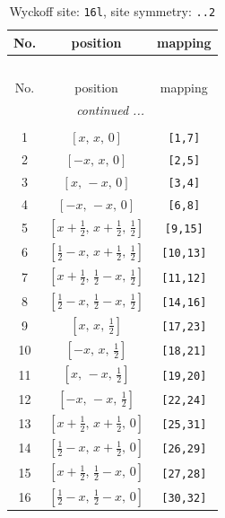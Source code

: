 \documentclass[fleqn,8pt]{jsarticle}
\begin{document}
\renewcommand{\arraystretch}{1.2}
\begin{longtable}{ccc}
\caption{Wyckoff site: {\tt 16l}, site symmetry: {\tt ..2}}
 \\
 \hline \hline
No. & position & mapping \\ \hline \endfirsthead

\multicolumn{2}{l}{\tablename\ \thetable{}} \\
 \hline \hline
No. & position & mapping \\ \hline \endhead

 \hline \hline
\multicolumn{2}{r}{\footnotesize\it continued ...} \\ \endfoot

 \hline \hline
\multicolumn{2}{r}{} \\ \endlastfoot

1 & $\left[ x,\, x,\, 0 \right]$ & {\tt [1,7]} \\ \hline
2 & $\left[ - x,\, x,\, 0 \right]$ & {\tt [2,5]} \\ \hline
3 & $\left[ x,\, - x,\, 0 \right]$ & {\tt [3,4]} \\ \hline
4 & $\left[ - x,\, - x,\, 0 \right]$ & {\tt [6,8]} \\ \hline
5 & $\left[ x + \frac{1}{2},\, x + \frac{1}{2},\, \frac{1}{2} \right]$ & {\tt [9,15]} \\ \hline
6 & $\left[ \frac{1}{2} - x,\, x + \frac{1}{2},\, \frac{1}{2} \right]$ & {\tt [10,13]} \\ \hline
7 & $\left[ x + \frac{1}{2},\, \frac{1}{2} - x,\, \frac{1}{2} \right]$ & {\tt [11,12]} \\ \hline
8 & $\left[ \frac{1}{2} - x,\, \frac{1}{2} - x,\, \frac{1}{2} \right]$ & {\tt [14,16]} \\ \hline
9 & $\left[ x,\, x,\, \frac{1}{2} \right]$ & {\tt [17,23]} \\ \hline
10 & $\left[ - x,\, x,\, \frac{1}{2} \right]$ & {\tt [18,21]} \\ \hline
11 & $\left[ x,\, - x,\, \frac{1}{2} \right]$ & {\tt [19,20]} \\ \hline
12 & $\left[ - x,\, - x,\, \frac{1}{2} \right]$ & {\tt [22,24]} \\ \hline
13 & $\left[ x + \frac{1}{2},\, x + \frac{1}{2},\, 0 \right]$ & {\tt [25,31]} \\ \hline
14 & $\left[ \frac{1}{2} - x,\, x + \frac{1}{2},\, 0 \right]$ & {\tt [26,29]} \\ \hline
15 & $\left[ x + \frac{1}{2},\, \frac{1}{2} - x,\, 0 \right]$ & {\tt [27,28]} \\ \hline
16 & $\left[ \frac{1}{2} - x,\, \frac{1}{2} - x,\, 0 \right]$ & {\tt [30,32]} \\
\end{longtable}
\end{document}
